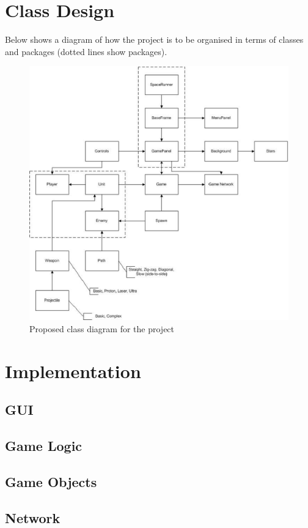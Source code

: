 \section{Class Design}
\label{sec: class_design}
Below shows a diagram of how the project is to be organised in terms of classes and packages (dotted lines show packages).
\begin{figure}
 \centering
 \includegraphics{class_diagram.eps}
 \caption{Proposed class diagram for the project}
 \label{fig: class_diagram}
\end{figure}

\section{Implementation}
\subsection{GUI}
\subsection{Game Logic}
\subsection{Game Objects}
\subsection{Network}


